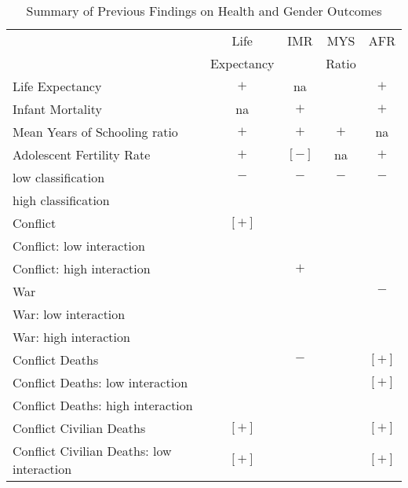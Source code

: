 \begin{table}[!htbp]
\footnotesize
\centering
\caption{Summary of Previous Findings on Health and Gender Outcomes}
\label{table_panel_gh}
\begin{tabular}{lc|c|c|c}
\toprule
                                           & Life       & IMR     & MYS     & AFR \\
                                           & Expectancy &         & Ratio   & \\
\midrule
Life Expectancy                                   & $+$   & na      &         & $+$ \\
Infant Mortality                                  & na    & $+$     &         & $+$ \\
Mean Years of Schooling ratio                     & $+$   & $+$     & $+$     & na \\
Adolescent Fertility Rate                         & $+$   & $[-]$   & na      & $+$ \\
low classification                                & $-$   & $-$     & $-$     & $-$ \\
high classification                               &       &         &         & \\
Conflict                                          & $[+]$ &         &         & \\
\qquad Conflict: low interaction                  &       &         &         & \\
\qquad Conflict: high interaction                 &       & $+$     &         & \\
War                                               &       &         &         & $-$ \\
\qquad War: low interaction                       &       &         &         & \\
\qquad War: high interaction                      &       &         &         & \\
Conflict Deaths                                   &       & $-$     &         & $[+]$ \\
\qquad Conflict Deaths: low interaction           &       &         &         & $[+]$ \\
\qquad Conflict Deaths: high interaction          &       &         &         & \\
Conflict Civilian Deaths                          & $[+]$ &         &         & $[+]$ \\
\qquad Conflict Civilian Deaths: low interaction  & $[+]$ &         &         & $[+]$ \\

\end{tabular}
\end{table}
